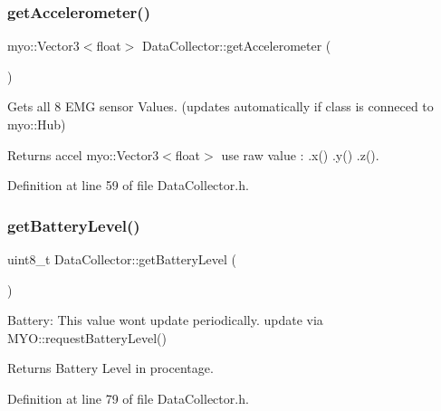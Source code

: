 \subsubsection{\texorpdfstring{get\+Accelerometer()}{getAccelerometer()}}
{\footnotesize\ttfamily myo\+::\+Vector3$<$float$>$ Data\+Collector\+::get\+Accelerometer (\begin{DoxyParamCaption}{ }\end{DoxyParamCaption})\hspace{0.3cm}{\ttfamily [inline]}}



Gets all 8 E\+MG sensor Values. (updates automatically if class is conneced to myo\+::\+Hub) 

\begin{DoxyReturn}{Returns}
accel myo\+::\+Vector3$<$float$>$ use raw value \+: .x() .y() .z(). 
\end{DoxyReturn}


Definition at line 59 of file Data\+Collector.\+h.

\mbox{\label{class_data_collector_a376b4be3194c56e25084df4097968a46}} 
\subsubsection{\texorpdfstring{get\+Battery\+Level()}{getBatteryLevel()}}
{\footnotesize\ttfamily uint8\+\_\+t Data\+Collector\+::get\+Battery\+Level (\begin{DoxyParamCaption}{ }\end{DoxyParamCaption})\hspace{0.3cm}{\ttfamily [inline]}}



Battery\+: This value wont update periodically. update via M\+Y\+O\+::request\+Battery\+Level() 

\begin{DoxyReturn}{Returns}
Battery Level in procentage. 
\end{DoxyReturn}


Definition at line 79 of file Data\+Collector.\+h.

\mbox{\label{class_data_collector_a4992b2e777defed813c7ce15a73bc84b}} 
